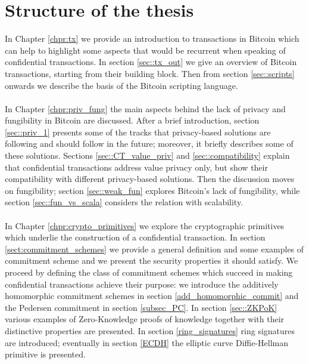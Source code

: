 \section{Structure of the thesis}
In Chapter \ref{chpr:tx} we provide an introduction to transactions in Bitcoin which can help to highlight some aspects that would be recurrent when speaking of confidential transactions. In section \ref{sec::tx_out} we give an overview of Bitcoin transactions, starting from their building block. Then from section \ref{sec::scripts} onwards we describe the basis of the Bitcoin scripting language.
\\ \ \\
In Chapter \ref{chpr:priv_fung} the main aspects behind the lack of privacy and fungibility in Bitcoin are discussed. After a brief introduction, section \ref{sec::priv_1} presents some of the tracks that privacy-based solutions are following and should follow in the future; moreover, it briefly describes some of these solutions. Sections \ref{sec::CT_value_priv} and \ref{sec::compatibility} explain that confidential transactions address value privacy only, but show their compatibility with different privacy-based solutions. Then the discussion moves on fungibility; section \ref{sec::weak_fun} explores Bitcoin's lack of fungibility, while section \ref{sec::fun_vs_scala} considers the relation with scalability.
\\ \ \\
In Chapter \ref{chpr:crypto_primitives} we explore the cryptographic primitives which underlie the construction of a confidential transaction. In section \ref{sect:commitment_schemes} we provide a general definition and some examples of commitment scheme and we present the security properties it should satisfy. We proceed by defining the class of commitment schemes which succeed in making confidential transactions achieve their purpose: we introduce the additively homomorphic commitment schemes in section \ref{add_homomorphic_commit} and the Pedersen commitment in section \ref{subsec_PC}. In section \ref{sec::ZKPoK} various examples of Zero-Knowledge proofs of knowledge together with their distinctive properties are presented. In section \ref{ring_signatures} ring signatures are introduced; eventually in section \ref{ECDH} the elliptic curve Diffie-Hellman primitive is presented.
\\ \ \\
